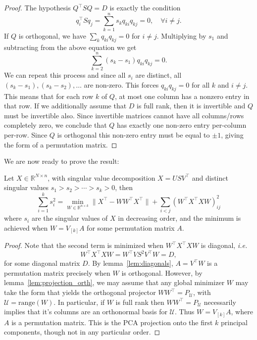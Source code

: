 \documentclass[twoside,11pt]{article}
\begin{document}
\begin{proof}
    The hypothesis $Q^\top SQ = D$ is exactly the condition
    \[q_i^\top Sq_j = \sum_{k=1}^n s_kq_{ki}q_{kj} = 0, \quad\forall i\ne j.\]
    If $Q$ is orthogonal, we have $\sum_{k}q_{ki}q_{kj} = 0$ for $i\ne j$. Multiplying by $s_1$ and subtracting from the above equation we get
    \[\sum_{k=2}^n(s_k-s_1)q_{ki}q_{kj} = 0.\]
    We can repeat this process and since all $s_i$ are distinct, all $(s_k-s_1), (s_k-s_2), \dots$ are non-zero. This forces $q_{ki}q_{kj} = 0$ for all $k$ and $i\ne j$. This means that for each row $k$ of $Q$, at most one column has a nonzero entry in that row. If we additionally assume that $D$ is full rank, then it is invertible and $Q$ must be invertible also. Since invertible matrices cannot have all columns/rows completely zero, we conclude that $Q$ has exactly one non-zero entry per-column per-row. Since $Q$ is orthogonal this non-zero entry must be equal to $\pm1$, giving the form of a permutation matrix. 
\end{proof}

We are now ready to prove the result:
\begin{theorem}
    Let $X \in \mathbb{R}^{N \times n}$, with singular value decomposition $X=USV^\top$ and distinct singular values $s_1>s_2>\cdots>s_k>0$, then 
    \[\sum_{i=1}^k s_i^2 = \min_{W \in \mathbb{R}^{n \times k}}  \|X^\top - WW^\top X^\top\|+ \sum_{i<j}(W^\top X^\top XW)_{ij}^2 \]
    where $s_i$ are the singular values of $X$ in decreasing order, and the minimum is achieved when $W=V_{[k]}A$ for some permutation matrix $A$.
\end{theorem}

\begin{proof}
    Note that the second term is minimized when $W^\top X^\top XW$ is diagonal, \emph{i.e.} \[W^\top X^\top XW = W^\top VS^2V^\top W = D,\] for some diagonal matrix $D$. By lemma~\ref{lem:diagonals}, $A = V^\top W$ is a permutation matrix precisely when $W$ is orthogonal. However, by lemma~\ref{lem:projection_orth}, we may assume that any global minimizer $W$ may take the form that yields the orthogonal projector $W W^\top = P_{\mathcal{U}}$, with $ \mathcal{U} = \mathrm{range}(W)$. In particular, if $W$ is full rank then $W W^\top = P_{\mathcal{U}}$ necessarily implies that it's columns are an orthonormal basis for $\mathcal{U}$. Thus $W = V_{[k]}A$, where $A$ is a permutation matrix. This is the PCA projection onto the first $k$ principal components, though not in any particular order. 
\end{proof}
\end{document}
